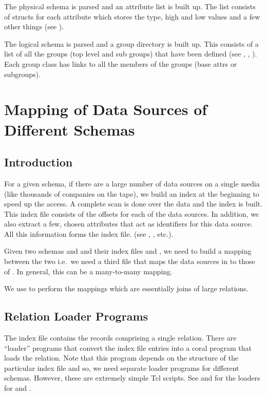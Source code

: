 The physical schema is parsed and an attribute list is built up. The
list consists of  structs for each attribute which
stores the type, high and low values and a few other things (see
).

The logical schema is parsed and a group directory is built up. This
consists of a list of all the groups (top level and sub groups) that
have been defined (see ,
, ). Each group class has
links to all the members of the groups (base attrs or subgroups).

\section{Mapping of Data Sources of Different Schemas}

\subsection{Introduction}

For a given schema, if there are a large number of data sources on a
single media (like thousands of companies on the 
tape), we build an index at the beginning to speed up the access. A
complete scan is done over the data and the index is built.  This
index file consists of the offsets for each of the data sources. In
addition, we also extract a few, chosen attributes that act as
identifiers for this data source.  All this information forms the
index file. (see , , etc.).

Given two schemas  and  and their index files
 and , we need to build a mapping
between the two i.e.\ we need a third file 
that maps the data sources in  to those of .  In
general, this can be a many-to-many mapping.

We use  to perform the mappings which are essentially
joins of large relations.

\subsection{Relation Loader Programs}

The index file contains the records comprising a single relation.
There are ``loader'' programs that convert the index file entries into
a coral program that loads the relation. Note that this program
depends on the structure of the particular index file and so, we need
separate loader programs for different schemas. However, these are
extremely simple Tcl scripts.  See  and
 for the loaders for  and
.

